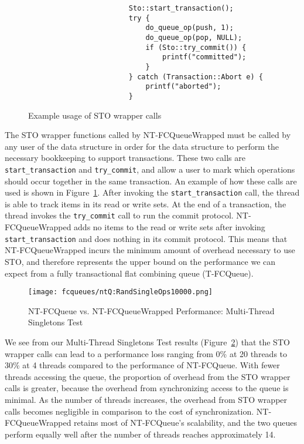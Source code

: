 \begin{figure}[t!]
\centering
\singlespace
{}
	\begin{lstlisting}
                        Sto::start_transaction();
                        try {
                            do_queue_op(push, 1);
                            do_queue_op(pop, NULL);
                            if (Sto::try_commit()) {
                                printf("committed");
                            }
                        } catch (Transaction::Abort e) {
                            printf("aborted");
                        }
	\end{lstlisting}
\caption{Example usage of STO wrapper calls}
\label{fig:wrappers}
\end{figure}
The STO wrapper functions called by NT-FCQueueWrapped must be called by any user of the data structure in order for the data structure to perform the necessary bookkeeping to support transactions.
These two calls are \texttt{start\_transaction} and \texttt{try\_commit}, and allow a user to mark which operations should occur together in the same transaction. An example of how these calls are used is shown in Figure~\ref{fig:wrappers}. After invoking the \texttt{start\_transaction} call, the thread is able to track items in its read or write sets. At the end of a transaction, the thread invokes the \texttt{try\_commit} call to run the commit protocol. NT-FCQueueWrapped adds no items to the read or write sets after invoking \texttt{start\_transaction} and does nothing in its commit protocol. This means that NT-FCQueueWrapped incurs the minimum amount of overhead necessary to use STO, and therefore represents the upper bound on the performance we can expect from a fully transactional flat combining queue (T-FCQueue). 

\begin{figure}[t!]
    \centering
   	\begin{minipage}{\textwidth}
        {\texttt{[image: fcqueues/ntQ:RandSingleOps10000.png]}}
	\end{minipage}
   \caption{NT-FCQueue vs. NT-FCQueueWrapped Performance: Multi-Thread Singletons Test}
    \label{fig:wrappedqs}
\end{figure}


We see from our Multi-Thread Singletons Test results (Figure~\ref{fig:wrappedqs}) that the STO wrapper calls can lead to a performance loss ranging from 0\% at 20 threads to 30\% at 4 threads compared to the performance of NT-FCQueue. 
 With fewer threads accessing the queue, the proportion of overhead from the STO wrapper calls is greater, because the overhead from synchronizing access to the queue is minimal. As the number of threads increases, the overhead from STO wrapper calls becomes negligible in comparison to the cost of synchronization.
NT-FCQueueWrapped retains most of NT-FCQueue's scalability, and the two queues perform equally well after the number of threads reaches approximately 14.


